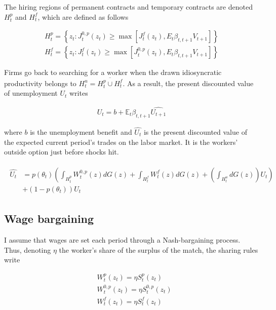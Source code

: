 The hiring regions of permanent contracts and temporary contracts are denoted $H_t^p$ and $H_t^f$, which are defined as follows

\begin{align}
H_t^p = \left\{ z_t : J_{t}^{0,p} \left( z_t \right) \geq \max\left[ J_{t}^{f} \left( z_t \right) ,  E_{t} \beta_{t,t+1} V_{t+1}  \right] \right\}\\
H_t^f = \left\{ z_t : J_{t}^{f} \left( z_t \right) \geq \max\left[ J_{t}^{0,p} \left( z_t \right) ,  E_{t} \beta_{t,t+1} V_{t+1}  \right] \right\}
\end{align}

Firms go back to searching for a worker when the drawn idiosyncratic productivity belongs to $H_t^u = \overline{H_t^p \cup H_t^f}$. As a result, the present discounted value of unemployment $U_t$ writes

\begin{align}  \label{eq:def_u}
U_t = b + \mathbb{E}_{t} \beta_{t,t+1} \widehat{U_{t+1}}
\end{align}

where $b$ is the unemployment benefit and $\widehat{U_t}$ is the present discounted value of the expected current period's trades on the labor market. It is the workers' outside option just before shocks hit. 

\begin{align} \label{eq:def_uhat}
\begin{split}
\widehat{U_t} &= p\left( \theta_t \right) \left( \int_{H_t^p} W_t^{0,p} (z) dG(z) + \int_{H_t^f} W_t^{f} (z) dG(z) + \left( \int_{H_t^u} dG(z) \right) U_{t} \right)\\
&+ \left( 1 - p\left( \theta_t \right) \right) U_{t}
\end{split}
\end{align}

\subsection{Wage bargaining}

I assume that wages are set each period through a Nash-bargaining process. Thus, denoting $\eta$ the worker's share of the surplus of the match, the sharing rules write

\begin{align}
&W_t^p \left( z_t \right) = \eta S_t^p \left( z_t \right) \label{eq:nash_p}\\
&W_t^{0,p} \left( z_t \right) = \eta S_t^{0,p} \left( z_t \right) \label{eq:nash_0p}\\
&W_t^f \left( z_t \right) = \eta S_t^f \left( z_t \right) \label{eq:nash_f}
\end{align}


